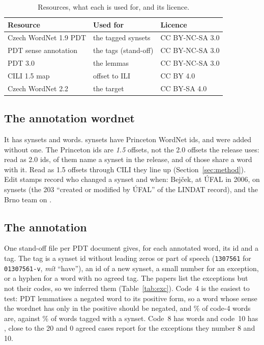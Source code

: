 \documentclass[a4paper,12pt]{article}
\begin{document}
\begin{table}[ht]
  \centering\small
  \begin{tabular}{@{}lll@{}}
    \toprule
    Resource & Used for & Licence \\
    \midrule
    Czech WordNet 1.9 PDT \citep{cwn19pdt2011} & the tagged synsets & CC BY-NC-SA 3.0 \\
    PDT sense annotation \citep{pdt-wsd2011} & the tags (stand-off) & CC BY-NC-SA 3.0 \\
    PDT 3.0 \citep{pdt30} & the lemmas & CC BY-NC-SA 3.0 \\
    CILI 1.5 map \citep{bond-etal2016cili} & offset to ILI & CC BY 4.0 \\
    Czech WordNet 2.2 \citep{pala-etal2026wncze} & the target & CC BY-SA 4.0 \\
    \bottomrule
  \end{tabular}
  \caption{Resources, what each is used for, and its licence.}
  \label{tab:data}
\end{table}

\subsection{The annotation wordnet}

  It has 
synsets and  words.   synsets
have Princeton WordNet ids, and  were added
without one.  The Princeton ids are \emph{1.5} offsets, not the 2.0
offsets the release uses: read as 2.0 ids,  of them
name a synset in the release, and  of those share a word
with it.  Read as 1.5 offsets through CILI they line up
(Section~\ref{sec:method}).  Edit stamps record who changed a synset and
when: Bejček, at ÚFAL in 2006, on  synsets (the 203
``created or modified by ÚFAL'' of the LINDAT record), and the Brno team on
.

\subsection{The annotation}

  One stand-off file per PDT document gives,
for each annotated word, its id and a tag.  The tag is a synset id without
leading zeros or part of speech (\texttt{1307561} for \texttt{01307561-v},
\textit{mít} ``have''), an id of a new synset, a small number for an
exception, or a hyphen for a word with no agreed tag.  The papers list the
exceptions but not their codes, so we inferred them (Table~\ref{tab:exc}).
Code~4 is the easiest to test: PDT lemmatises a negated word to its
positive form, so a word whose sense the wordnet has only in the positive
should be negated, and \% of code-4 words are, against
\% of words tagged with a synset.  Code~8 has
 words and code~10 has , close to the
20 and 0 agreed cases \citet{bejcek-etal2006} report for the exceptions
they number 8 and 10.
\end{document}
